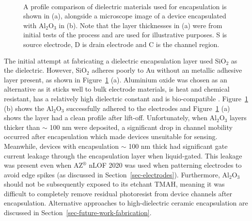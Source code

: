 \documentclass[
  a4paper,
]{scrbook}
\begin{document}
\begin{figure}
\begin{minipage}[t]{0.42\linewidth}
{{}

}

\end{minipage}%
%
\begin{minipage}[t]{0.01\linewidth}

{\centering 

~

}

\end{minipage}%

\caption{\label{fig-dektat-dielectric-layer}A profile comparison of
dielectric materials used for encapsulation is shown in (a), alongside a
microscope image of a device encapsulated with Al\(_2\)O\(_3\) in (b).
Note that the layer thicknesses in (a) were from initial tests of the
process and are used for illustrative purposes. S is source electrode, D
is drain electrode and C is the channel region.}

\end{figure}

The initial attempt at fabricating a dielectric encapsulation layer used
SiO\(_2\) as the dielectric. However, SiO\(_2\) adheres poorly to Au
without an metallic adhesive layer present, as shown in
Figure~\ref{fig-dektat-dielectric-layer} (a). Aluminium oxide was chosen
as an alternative as it sticks well to bulk electrode materials, is heat
and chemical resistant, has a relatively high dielectric constant and is
bio-compatible \autocite{Guarnieri2014,Albarghouthi2022,Kolodzey2000}.
Figure~\ref{fig-dektat-dielectric-layer} (b) shows the Al\(_2\)O\(_3\)
successfully adhered to the electrodes and
Figure~\ref{fig-dektat-dielectric-layer} (a) shows the layer had a clean
profile after lift-off. Unfortunately, when Al\(_2\)O\(_3\) layers
thicker than \(\sim\) 100 nm were deposited, a significant drop in
channel mobility occurred after encapsulation which made devices
unsuitable for sensing. Meanwhile, devices with encapsulation \(\sim\)
100 nm thick had significant gate current leakage through the
encapsulation layer when liquid-gated. This leakage was present even
when AZ\(^\circledR\) nLOF 2020 was used when patterning electrodes to
avoid edge spikes (as discussed in Section~\ref{sec-electrodes}).
Furthermore, Al\(_2\)O\(_3\) should not be subsequently exposed to its
etchant TMAH, meaning it was difficult to completely remove residual
photoresist from device channels after encapsulation. Alternative
approaches to high-dielectric ceramic encapsulation are discussed in
Section~\ref{sec-future-work-fabrication}.
\end{document}
